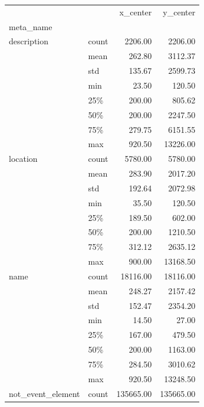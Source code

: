 \begin{table}
\begin{center}


\begin{tabular}{llrr}
\toprule
            &       &   x\_center &   y\_center \\
meta\_name & {} &            &            \\
\midrule
description & count &    2206.00 &    2206.00 \\
            & mean &     262.80 &    3112.37 \\
            & std &     135.67 &    2599.73 \\
            & min &      23.50 &     120.50 \\
            & 25\% &     200.00 &     805.62 \\
            & 50\% &     200.00 &    2247.50 \\
            & 75\% &     279.75 &    6151.55 \\
            & max &     920.50 &   13226.00 \\
location & count &    5780.00 &    5780.00 \\
            & mean &     283.90 &    2017.20 \\
            & std &     192.64 &    2072.98 \\
            & min &      35.50 &     120.50 \\
            & 25\% &     189.50 &     602.00 \\
            & 50\% &     200.00 &    1210.50 \\
            & 75\% &     312.12 &    2635.12 \\
            & max &     900.00 &   13168.50 \\
name & count &   18116.00 &   18116.00 \\
            & mean &     248.27 &    2157.42 \\
            & std &     152.47 &    2354.20 \\
            & min &      14.50 &      27.00 \\
            & 25\% &     167.00 &     479.50 \\
            & 50\% &     200.00 &    1163.00 \\
            & 75\% &     284.50 &    3010.62 \\
            & max &     920.50 &   13248.50 \\
not\_event\_element & count &  135665.00 &  135665.00 \\

\end{tabular}
\end{center}
\end{table}
